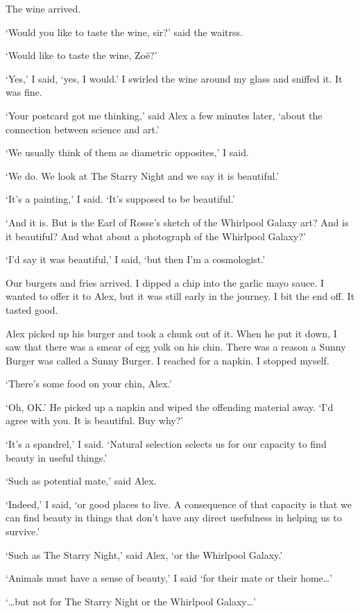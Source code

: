The wine arrived.

`Would you like to taste the wine, sir?' said the waitrss.

`Would like to taste the wine, Zoë?'

`Yes,' I said, `yes, I would.' I swirled the wine around my glass
and sniffed it. It was fine.

`Your postcard got me thinking,' said Alex a few minutes later,
`about the connection between science and art.'

`We usually think of them as diametric opposites,' I said.

`We do. We look at {\twelvesl The Starry Night\/} and we say it is
beautiful.'

`It's a painting,' I said. `It's supposed to be beautiful.'

`And it is. But is the Earl of Rosse's sketch of the Whirlpool
Galaxy art? And is it beautiful? And what about a photograph of the
Whirlpool Galaxy?'

`I'd say it was beautiful,' I said, `but then I'm a cosmologist.'

Our burgers and fries arrived. I dipped a chip into the garlic mayo
sauce. I wanted to offer it to Alex, but it was still early in the
journey. I bit the end off. It tasted good.

Alex picked up his burger and took a chunk out of it. When he put it down, I saw that there was
a smear of egg yolk on his chin. There was a reason a Sunny Burger
was called a Sunny Burger. I reached for a napkin. I stopped myself.

`There's some food on your chin, Alex.'

`Oh, OK.' He picked up a napkin and wiped the offending material
away. `I'd agree with you. It is beautiful. Buy why?'

`It's a spandrel,' I said. `Natural selection selects us for our
capacity to find beauty in useful things.'

`Such as potential mate,' said Alex.

`Indeed,' I said, `or good places to live. A consequence of that
capacity is that we can find beauty in things that don't have any
direct usefulness in helping us to survive.'

`Such as {\twelvesl The Starry Night\/},' said Alex, `or the
Whirlpool Galaxy.'

`Animals must have a sense of beauty,' I said `for their mate or
their home\dots'

`{\dots}but not for {\twelvesl The Starry Night\/} or the Whirlpool
Galaxy\dots'

